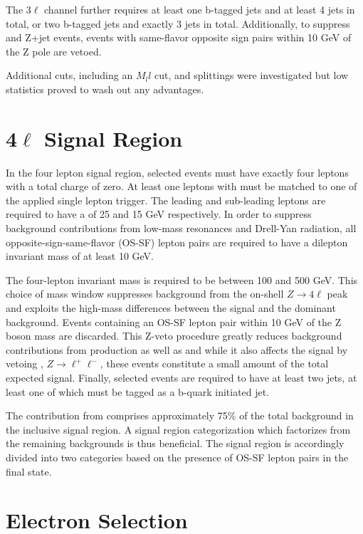 The 3$\ell$ channel further requires at least one b-tagged jets and at least 4 jets in total, or two b-tagged jets and exactly 3 jets in 
total. Additionally, to suppress \WZ and Z+jet events, events with same-flavor opposite sign pairs
within 10 GeV of the Z pole are vetoed.

Additional cuts, including an $M_ll$ cut, and splittings were investigated but low statistics proved to wash out any advantages. 

\section{4$\ell$ Signal Region}

In the four lepton signal region, selected events must have exactly four leptons with a total charge of zero. 
At least one leptons with must be matched to one of the applied single lepton trigger. 
The leading and sub-leading leptons are required to have a \pt of 25 and 15 GeV respectively. 
In order to suppress background contributions from low-mass resonances and Drell-Yan radiation, all opposite-sign-same-flavor (OS-SF) lepton pairs are required to have a dilepton invariant mass of at least 10 GeV. 

The four-lepton invariant mass is required to be between 100 and 500 GeV. 
This choice of mass window suppresses background from the on-shell $Z\to4\ell$ peak and exploits the high-mass differences between the signal and the dominant \ttZ background. 
Events containing an OS-SF lepton pair within 10 GeV of the Z boson mass are discarded. 
This Z-veto procedure greatly reduces background contributions from \ZZ production as well as \ttZ and while it also affects the signal by vetoing \hzzstar, $Z\to\ell^+\ell^-$, these events constitute a small amount of the total expected signal. 
Finally, selected events are required to have at least two jets, at least one of which must be tagged as a b-quark initiated jet.  

The contribution from \ttZ comprises approximately 75\% of the total background in the inclusive signal region. 
A signal region categorization which factorizes \ttZ from the remaining backgrounds is thus beneficial. 
The signal region is accordingly divided into two categories based on the presence of OS-SF lepton pairs in the final state. 

\section{Electron Selection}

